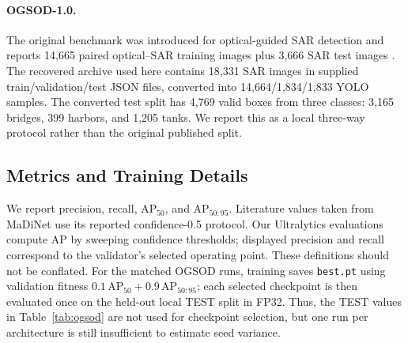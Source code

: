 \documentclass[letterpaper]{article}
\newcommand{\apfifty}{AP$_{50}$}
\newcommand{\apcoco}{AP$_{50:95}$}
\begin{document}
\paragraph{OGSOD-1.0.}
The original benchmark was introduced for optical-guided SAR detection and reports 14,665 paired optical--SAR training images plus 3,666 SAR test images \citep{ogsod}. The recovered archive used here contains 18,331 SAR images in supplied train/validation/test JSON files, converted into 14,664/1,834/1,833 YOLO samples. The converted test split has 4,769 valid boxes from three classes: 3,165 bridges, 399 harbors, and 1,205 tanks. We report this as a local three-way protocol rather than the original published split.

\subsection{Metrics and Training Details}

We report precision, recall, \apfifty{}, and \apcoco{}. Literature values taken from MaDiNet use its reported confidence-0.5 protocol. Our Ultralytics evaluations compute AP by sweeping confidence thresholds; displayed precision and recall correspond to the validator's selected operating point. These definitions should not be conflated. For the matched OGSOD runs, training saves \texttt{best.pt} using validation fitness $0.1\,\mathrm{AP}_{50}+0.9\,\mathrm{AP}_{50:95}$; each selected checkpoint is then evaluated once on the held-out local TEST split in FP32. Thus, the TEST values in Table~\ref{tab:ogsod} are not used for checkpoint selection, but one run per architecture is still insufficient to estimate seed variance.

\begin{table}[t]
\centering
\small
\caption{Training settings for current representative runs.}
\label{tab:training}
\end{table}
\end{document}
